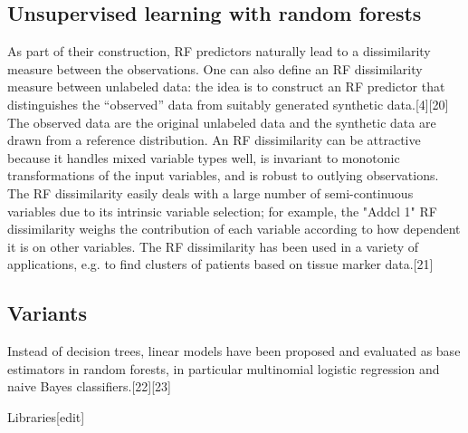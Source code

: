 \subsection{Unsupervised learning with random forests}
As part of their construction, RF predictors naturally lead to a dissimilarity measure between the observations. One can also define an RF dissimilarity measure between unlabeled data: the idea is to construct an RF predictor that distinguishes the “observed” data from suitably generated synthetic data.[4][20] The observed data are the original unlabeled data and the synthetic data are drawn from a reference distribution. An RF dissimilarity can be attractive because it handles mixed variable types well, is invariant to monotonic transformations of the input variables, and is robust to outlying observations. The RF dissimilarity easily deals with a large number of semi-continuous variables due to its intrinsic variable selection; for example, the "Addcl 1" RF dissimilarity weighs the contribution of each variable according to how dependent it is on other variables. The RF dissimilarity has been used in a variety of applications, e.g. to find clusters of patients based on tissue marker data.[21]

\subsection{Variants}
Instead of decision trees, linear models have been proposed and evaluated as base estimators in random forests, in particular multinomial logistic regression and naive Bayes classifiers.[22][23]

Libraries[edit]
